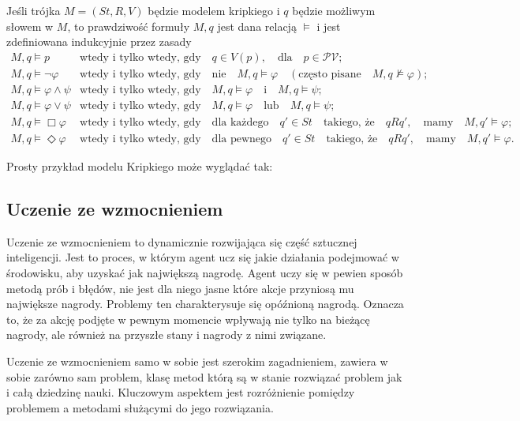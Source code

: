Jeśli trójka $M=(St,R,V)$ będzie modelem kripkiego i $q$ będzie możliwym słowem w $M$,
to prawdziwość formuły $M,q$ jest dana relacją $ \models $ i jest zdefiniowana indukcyjnie 
przez zasady
\[
\begin{array}{ll}
M, q \models p & \text{wtedy i tylko wtedy, gdy} \quad q \in V(p), \quad \text{dla} \quad p \in \mathcal{PV}; \\
M, q \models \neg \varphi & \text{wtedy i tylko wtedy, gdy} \quad \text{nie} \quad M, q \models \varphi \quad (\text{często pisane} \quad M, q \not\models \varphi); \\
M, q \models \varphi \land \psi & \text{wtedy i tylko wtedy, gdy} \quad M, q \models \varphi \quad \text{i} \quad M, q \models \psi; \\
M, q \models \varphi \lor \psi & \text{wtedy i tylko wtedy, gdy} \quad M, q \models \varphi \quad \text{lub} \quad M, q \models \psi; \\
M, q \models \Box \varphi & \text{wtedy i tylko wtedy, gdy} \quad \text{dla każdego} \quad q' \in St \quad \text{takiego, że} \quad q R q', \quad \text{mamy} \quad M, q' \models \varphi; \\
M, q \models \Diamond \varphi & \text{wtedy i tylko wtedy, gdy} \quad \text{dla pewnego} \quad q' \in St \quad \text{takiego, że} \quad q R q', \quad \text{mamy} \quad M, q' \models \varphi.
\end{array}
\]

Prosty przykład modelu Kripkiego może wyglądać tak:


\subsection{Uczenie ze wzmocnieniem}
Uczenie ze wzmocnieniem to dynamicznie rozwijająca się część sztucznej inteligencji.
Jest to proces, w którym agent ucz się jakie działania podejmować w środowisku, 
aby uzyskać jak największą nagrodę. Agent uczy się w pewien sposób metodą prób i błędów,
nie jest dla niego jasne które akcje przyniosą mu największe nagrody. Problemy ten 
charakterysuje się opóźnioną nagrodą. Oznacza to, że za akcję podjęte w pewnym momencie 
wpływają nie tylko na bieżącę nagrody, ale również na przyszłe stany i nagrody z nimi związane.

Uczenie ze wzmocnieniem samo w sobie jest szerokim zagadnieniem, zawiera w sobie zarówno sam problem,
klasę metod którą są w stanie rozwiązać problem jak i całą dziedzinę nauki. Kluczowym aspektem 
jest rozróżnienie pomiędzy problemem a metodami służącymi do jego rozwiązania.

